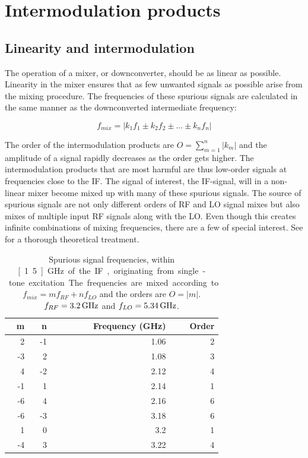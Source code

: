 		
	\section{Intermodulation products}
		\subsection{Linearity and intermodulation}
			The operation of a mixer, or downconverter, should be as linear as possible. Linearity in the mixer ensures that as few unwanted signals as possible arise from the mixing procedure. The frequencies of these spurious signals are calculated in the same manner as the downconverted intermediate frequency:\autocite{bahl03}

			\begin{equation}\label{eq:spurs}
				f_{mix} = |k_1f_1\pm k_2f_2 \pm ... \pm k_nf_n|
			\end{equation}
			
			The order of the intermodulation products are $O=\sum_{m=1}^n|k_m|$ and the amplitude of a signal rapidly decreases as the order gets higher. The intermodulation products that are most harmful are thus low-order signals at frequencies close to the IF. The signal of interest, the IF-signal, will in a non-linear mixer become mixed up with many of these spurious signals. The source of spurious signals are not only different orders of RF and LO signal mixes but also mixes of multiple input RF signals along with the LO. Even though this creates infinite combinations of mixing frequencies, there are a few of special interest. See \citeauthor{kundert02} for a thorough theoretical treatment\autocite{kundert02}.

		
			\begin{table}[hbt!]
			\caption[Single-tone spurious signals.]{Spurious signal frequencies, within \unit[1.5]{GHz} of the IF, originating from single-tone excitation. The frequencies are mixed according to $f_{mix} = mf_{RF} + nf_{LO}$ and the orders are $O=|m|$. $ f_{RF}=\unit[3.2]{GHz}$ and $ f_{LO}=\unit[5.34]{GHz}$.}
			\label{tab:introsingletone}
			\centering
			\begin{tabular}{rrrr}
				m & n & Frequency (GHz) & Order \\\hline  
				  2 &  -1 & 1.06 & 2 \\
				 -3 &   2 & 1.08 & 3 \\
				  4 &  -2 & 2.12 & 4 \\
				 -1 &   1 & 2.14 & 1 \\
				 -6 &   4 & 2.16 & 6 \\
				 -6 &  -3 & 3.18 & 6 \\
				  1 &   0 &  3.2 & 1 \\
				 -4 &   3 & 3.22 & 4
			\end{tabular}
			\end{table}
			
